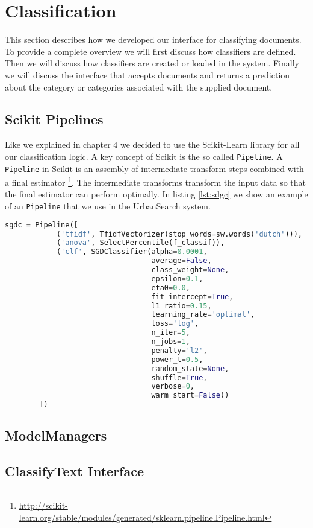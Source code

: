 \section{Classification}\label{5-classification}
This section describes how we developed our interface for classifying documents. To provide a complete overview we will first discuss how classifiers are defined. Then we will discuss how classifiers are created or loaded in the system. Finally we will discuss the interface that accepts documents and returns a prediction about the category or categories associated with the supplied document.
\subsection{Scikit Pipelines}
Like we explained in chapter 4 we decided to use the Scikit-Learn library for all our classification logic. A key concept of Scikit is the so called \texttt{Pipeline}. A \texttt{Pipeline} in Scikit is an assembly of intermediate transform steps combined with a final estimator \footnote{\url{http://scikit-learn.org/stable/modules/generated/sklearn.pipeline.Pipeline.html}}. The intermediate transforms transform the input data so that the final estimator can perform optimally. In listing \ref{lst:sdgc} we show an example of an \texttt{Pipeline} that we use in the UrbanSearch system. 

\begin{lstlisting}[language=python, caption={SGDC Pipeline}, label={lst:sdgc}]
sgdc = Pipeline([
            ('tfidf', TfidfVectorizer(stop_words=sw.words('dutch'))),
            ('anova', SelectPercentile(f_classif)),
            ('clf', SGDClassifier(alpha=0.0001,
                                  average=False,
                                  class_weight=None,
                                  epsilon=0.1,
                                  eta0=0.0,
                                  fit_intercept=True,
                                  l1_ratio=0.15,
                                  learning_rate='optimal',
                                  loss='log',
                                  n_iter=5,
                                  n_jobs=1,
                                  penalty='l2',
                                  power_t=0.5,
                                  random_state=None,
                                  shuffle=True,
                                  verbose=0,
                                  warm_start=False))
        ])
\end{lstlisting}
\subsection{ModelManagers}
\subsection{ClassifyText Interface}
